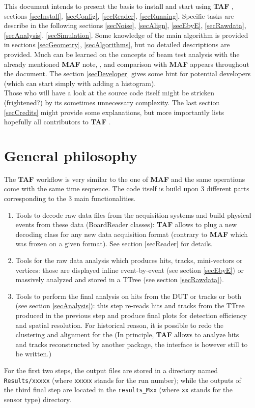 \documentclass[a4paper, 12pt, twoside]{article}
\newcommand{\TAF}{{\bf TAF }}
\newcommand{\MAF}{{\bf MAF }}
\begin{document}
\noindent
This document intends to present the basis to install and start using \TAF, sections \ref{secInstall}, \ref{secConfig}, \ref{secReader}, \ref{secRunning}. Specific tasks are describe in the following sections \ref{secNoise}, \ref{secAlign}, \ref{secEbyE}, \ref{secRawdata}, \ref{secAnalysis}, \ref{secSimulation}. Some knowledge of the main algorithm is provided in sections \ref{secGeometry}, \ref{secAlgorithms}, but no detailed descriptions are provided. Much can be learned on the concepts of beam test analysis with the already mentioned \MAF note, \cite{noteMAF}, and comparison with \MAF appears throughout the document. The section \ref{secDeveloper} gives some hint for potential developers (which can start simply with adding a histogram).\\
Those who will have a look at the source code itself might be stricken (frightened?) by its sometimes unnecessary complexity. The last section \ref{secCredits} might provide some explanations, but more importantly lists hopefully all contributors to \TAF.


\vspace{2cm}

\section{General philosophy}

The \TAF  workflow is very similar to the one of \MAF  and the same operations come with the same time sequence. The code itself is build upon 3 different parts corresponding to the 3 main functionalities.
\begin{enumerate}
\item Tools to decode raw data files from the acquisition systems and build physical events from these data (BoardReader classes): \TAF  allows to plug a new decoding class for any new data acquisition format (contrary to \MAF  which was frozen on a given format). See section \ref{secReader} for details.
\item Tools for the raw data analysis which produces hits, tracks, mini-vectors or vertices: those are displayed inline event-by-event (see section \ref{secEbyE}) or massively analyzed and stored in a TTree (see section \ref{secRawdata}).
\item Tools to perform the final analysis on hits from the DUT or tracks or both (see section \ref{secAnalysis}): this step re-reads hits and tracks from the TTree produced in the previous step and produce final plots for detection efficiency and spatial resolution. For historical reason, it is possible to redo the clustering and alignment for the (In principle, \TAF  allows to analyze hits and tracks reconstructed by another package, the interface is however still to be written.)
\end{enumerate}
For the first two steps, the output files are stored in a directory named {\tt Results/xxxxx} (where {\tt xxxxx} stands for the run number); while the outputs of the third final step are located in the {\tt results\_Mxx} (where {\tt xx} stands for the sensor type) directory.
\end{document}
